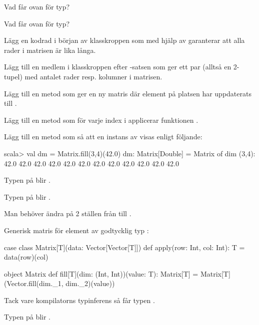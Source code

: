 \Subtask Vad får  ovan för typ?

\Subtask Vad får  ovan för typ?

\Subtask Lägg en kodrad i början av klasskroppen som med hjälp av  garanterar att alla rader i matrisen är lika långa.

\Subtask Lägg till en medlem  i klasskroppen efter -satsen som ger ett par (alltså en 2-tupel) med antalet rader resp. kolumner i matrisen.

\Subtask Lägg till en metod  som ger en ny matris där element på platsen  har uppdaterats till .

\Subtask Lägg till en metod  som för varje index i  applicerar funktionen .

\Subtask Lägg till en metod  som så att en instans av  visas enligt följande:
\begin{REPLnonum}
scala> val dm = Matrix.fill(3,4)(42.0)
dm: Matrix[Double] =
Matrix of dim (3,4):
42.0 42.0 42.0 42.0
42.0 42.0 42.0 42.0
42.0 42.0 42.0 42.0
\end{REPLnonum}


\SOLUTION


\TaskSolved \what

\SubtaskSolved Typen på  blir .

\SubtaskSolved Typen på  blir .

\SubtaskSolved Man behöver ändra på 2 ställen från  till .

\SubtaskSolved Generisk matris  för element av godtycklig typ :

\begin{CodeSmall}
case class Matrix[T](data: Vector[Vector[T]]) {
  def apply(row: Int, col: Int): T = data(row)(col)
}

object Matrix {
  def fill[T](dim: (Int, Int))(value: T): Matrix[T] =
    Matrix[T](Vector.fill(dim._1, dim._2)(value))
}
\end{CodeSmall}

\SubtaskSolved Tack vare kompilatorns typinferens så får  typen .

\SubtaskSolved Typen på  blir .

